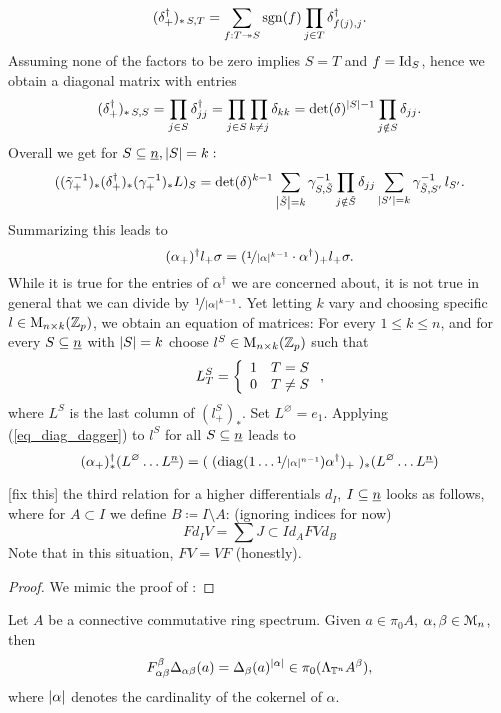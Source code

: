 \begin{rem}
$$ (\delta^\dagger_+)_{*\, S,T} = \sum_{f:T \twoheadrightarrow S} \operatorname{sgn}(f) \prod_{j \in T} \delta^\dagger_{f(j),j}.$$
Assuming none of the factors to be zero implies $S = T$ and $f = \mathrm{Id}_S$, hence we obtain a diagonal matrix with entries%
$$ (\delta^\dagger_+)_{*\,S,S} = \prod_{j \in S} \delta^\dagger_{jj} = \prod_{j \in S} \prod_{k \neq j} \delta_{kk} = \det(\delta)^{\left\vert S\right\vert-1} \prod_{j \notin S} \delta_{jj}.$$
Overall we get for $S \subseteq \underline{n}, \left\vert S\right\vert = k:$
$$ ( (\tilde\gamma_+^{-1})_* (\delta^\dagger_+)_* (\gamma_+^{-1})_* L )_S = %
\det(\delta)^{k-1} \sum_{\abs{\tilde S} = k} \gamma^{-1}_{S,\tilde S} \prod_{j \notin \tilde S} \delta_{jj} \sum_{ \abs{S^\prime} = k } \gamma^{-1}_{\tilde S,S^\prime}\, l_{S^\prime}.$$
Summarizing this leads to
\begin{equation}\label{eq_dagger_comparison}
(\alpha_+)^\dagger l_+ \sigma = (\nicefrac{1}{\left\vert\alpha\right\vert^{k-1}}\cdot\alpha^\dagger)_+ l_+ \sigma.\end{equation}
While it is true for the entries of $\alpha^\dagger$ we are concerned about, it is not true in general that we can divide by $\nicefrac{1}{\left\vert\alpha\right\vert^{k-1}}$. Yet letting $k$ vary and choosing specific $l \in \mathrm{M}_{n \times k}(\mathbb{Z}_p)$, we obtain an equation of matrices: For every $1 \leq k \leq n$, and for every $S \subseteq \underline{n}$ with $\left\vert S\right\vert = k$ choose $l^S \in \mathrm{M}_{n \times k}(\mathbb{Z}_p)$ such that%
$$L^S_T = \left\{ \begin{array}{ll} 1 & T=S \\ 0 & T \neq S \end{array} \right.,$$%
where $L^S$ is the last column of $(l^S_+)_*$. Set $L^\varnothing = e_1$. Applying (\ref{eq_diag_dagger}) to $l^S$ for all $S \subseteq \underline{n}$ leads to
$$	(\alpha_+)^\dagger_*( L^\varnothing \ldots L^{\ind{n}} ) = %
	( \; ( \diag( 1 \ldots \nicefrac{1}{\abs\alpha^{n-1}} ) \alpha^\dagger )_+ \; )_* %
	  ( L^\varnothing \ldots L^{\ind{n}} )$$
\end{rem}
%
%
\begin{lem}\label{lem_rel_FdV_higher_differentials}
[fix this] the third relation for a higher differentials $d_I$, $I \subseteq \underline{n}$ looks as follows, where for $A \subset I$ we define $B \coloneqq I \setminus A$: (ignoring indices for now)
\begin{equation*}
	F d_I V = \sum{J \subset I} d_A FV d_B
\end{equation*}
Note that in this situation, $FV = VF$ (honestly).
\begin{proof}
We mimic the proof of \cite[Thm. 3.21]{carlsson2011higher}:
\end{proof}
\end{lem}
%
%
\begin{lem}\label{lem_rel_F_Delta}
Let $A$ be a connective commutative ring spectrum. Given $a \in \pi_0 A$, $\alpha, \beta \in \mathcal{M}_n$, then
	\[ F_{\alpha\beta}^{\beta} \Delta_{\alpha\beta}(a) = \Delta_{\beta} (a)^{\left\vert\alpha\right\vert} \in \pi_0(\Lambda_{\mathbb{T}^n} A ^\beta), \]
where $\left\vert\alpha\right\vert$ denotes the cardinality of the cokernel of $\alpha$.
\end{lem}
